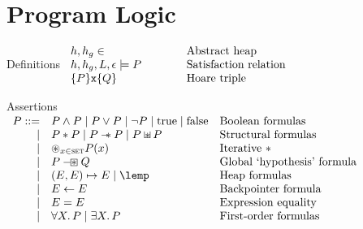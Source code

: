 \documentclass[a4paper,notitlepage]{report}
\begin{document}
\chapter{Program Logic}
\newcommand{\defline}[2]{#1 & \qquad & \text{#2}\\}
\begin{display}{Definitions}
  $\begin{array}{lll}
    \defline{h,h_g \in}{Abstract heap}
    \defline{h,h_g,L,\env \satisfies P}{Satisfaction relation}
    \defline{\tr{P}{\js{x}}{Q}}{Hoare triple}
  \end{array}$
\end{display}

\newcommand{\asrtline}[3][\pipe]{#1 & #2 & \text{#3}\\}
\begin{display}{Assertions}
  $\begin{array}{rll}
    \asrtline[P ::=]{P \land P \pipe P \lor P \pipe \lnot P \pipe \ltrue \pipe
    \lfalse}{Boolean formulas}
    \asrtline{P \sep P \pipe P \wand P \pipe P \sepish P}{Structural formulas}
    \asrtline{\bigsep_{x \in \T{set}} P(x)}{Iterative $\sep$}
    \asrtline{P \boxwand Q}{Global `hypothesis' formula}
    \asrtline{(E,E) \pointsto E \pipe \lemp}{Heap formulas}
    \asrtline{E \bp E}{Backpointer formula}
    \asrtline{E = E}{Expression equality}
    \asrtline{\forall X \st P \pipe \exists X \st P}{First-order formulas}
  \end{array}$
\end{display}
\end{document}
